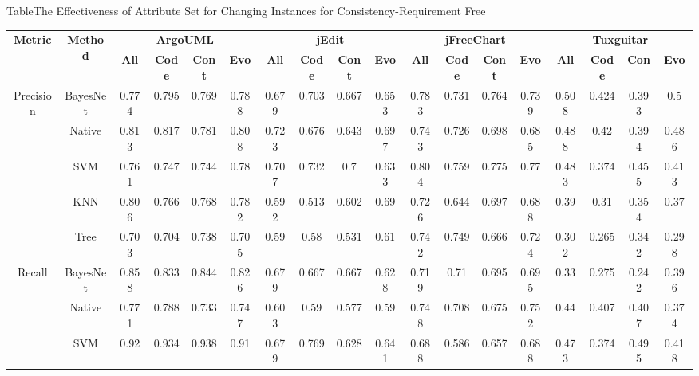 {\begin{table*}[htbp]
\scriptsize
{Table$\!$}{The Effectiveness of Attribute Set for Changing Instances for Consistency-Requirement Free}
\vspace{0.5em}
\centering
\begin{tabular}{cccccccccccccccccc}
\toprule[1.5pt]
\multirow{2}{*}{\textbf{Metric}}&\multirow{2}{*}{\textbf{Method}}&\multicolumn{4}{c}{\textbf{ArgoUML}}&\multicolumn{4}{c}{\textbf{jEdit}}&\multicolumn{4}{c}{\textbf{jFreeChart}}&\multicolumn{4}{c}{\textbf{Tuxguitar}}\\
\cline{3-18}
&&\textbf{All}&\textbf{Code}&\textbf{Cont}&\textbf{Evo}&\textbf{All}&\textbf{Code}&\textbf{Cont}&\textbf{Evo}&\textbf{All}&\textbf{Code}&\textbf{Cont}&\textbf{Evo}&\textbf{All}&\textbf{Code}&\textbf{Con}&\textbf{Evo}~\\
\midrule[1pt]
\multirow{5}{*}{Precision}
&BayesNet&0.774&	0.795	&0.769	&0.788		&0.679	&0.703	&0.667	&0.653		&0.783	&0.731	&0.764	&0.739	&	0.508	&0.424	&0.393	&0.5\\
&Native&0.813	&0.817	&0.781&	0.808	&	0.723	&0.676	&0.643	&0.697	&	0.743	&0.726&	0.698&	0.685	&	0.488	&0.42	&0.394	&0.486\\
&SVM&	0.761	&0.747	&0.744	&0.78	&	0.707	&0.732	&0.7	&0.633		&0.804	&0.759	&0.775	&0.77	&	0.483&	0.374	&0.455	&0.413\\
&KNN&	0.806	&0.766	&0.768	&0.782	&	0.592	&0.513	&0.602	&0.69		&0.726	&0.644	&0.697	&0.688		&0.39	&0.31	&0.354	&0.37\\
&Tree&	0.703&	0.704	&0.738	&0.705	&	0.59	&0.58&	0.531	&0.61		&0.742	&0.749	&0.666	&0.724		&0.302	&0.265	&0.342	&0.298\\
\hline
\multirow{5}{*}{Recall}
&BayesNet&0.858&	0.833	&0.844	&0.826	&	0.679&	0.667	&0.667	&0.628	&	0.719	&0.71	&0.695	&0.695&		0.33	&0.275	&0.242&	0.396\\
&Native&0.771	&0.788	&0.733	&0.747	&	0.603&	0.59&	0.577	&0.59	&	0.748	&0.708	&0.675	&0.752	&	0.44	&0.407	&0.407&	0.374\\
&SVM&	0.92	&0.934&	0.938&	0.91	&	0.679	&0.769	&0.628	&0.641&		0.688&	0.586	&0.657	&0.688	&	0.473	&0.374	&0.495	&0.418\\

\end{tabular}
\end{table*}}
